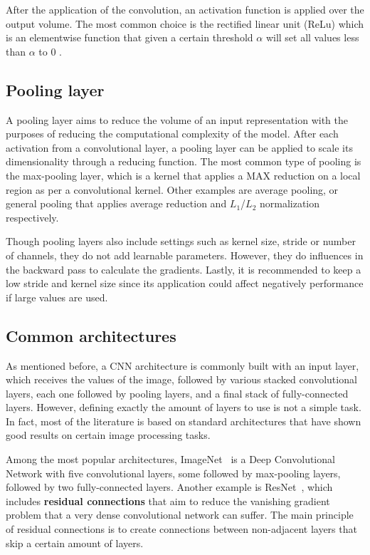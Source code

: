 After the application of the convolution, an activation function is applied over the output 
volume. The most common choice is the rectified linear unit (ReLu) which is an elementwise 
function that given a certain threshold $\alpha$ will set all values less than $\alpha$ to 0 .

\subsection{Pooling layer}
A pooling layer aims to reduce the volume of an input representation with the purposes of 
reducing the computational complexity of the model. After each activation from a convolutional 
layer, a pooling layer can be applied to scale its dimensionality through a reducing function. 
The most common type of pooling is the max-pooling layer, which is a kernel that applies a 
MAX reduction on a local region as per a convolutional kernel. Other examples are average 
pooling, or general pooling that applies average reduction and $L_1$/$L_2$ normalization 
respectively.

Though pooling layers also include settings such as kernel size, stride or number of channels, 
they do not add learnable parameters. However, they do influences in the backward pass to 
calculate the gradients. Lastly, it is recommended to keep a low stride and kernel size since 
its application could affect negatively performance if large values are used.

\subsection{Common architectures}
As mentioned before, a CNN architecture is commonly built with an input layer, which receives 
the values of the image, followed by various stacked convolutional layers, each one followed 
by pooling layers, and a final stack of fully-connected layers. However, defining exactly the 
amount of layers to use is not a simple task. In fact, most of the literature is based on 
standard architectures that have shown good results on certain image processing tasks.

Among the most popular architectures, ImageNet~\cite{appendix:KrizhevskySH12} is a Deep 
Convolutional Network with five convolutional layers, some followed by max-pooling layers, 
followed by two fully-connected layers. Another example is ResNet~\cite{appendix:HeZRS16}, 
which includes \textbf{residual connections} that aim to reduce the vanishing gradient 
problem that a very dense convolutional network can suffer. The main principle of residual 
connections is to create connections between non-adjacent layers that skip a certain 
amount of layers.